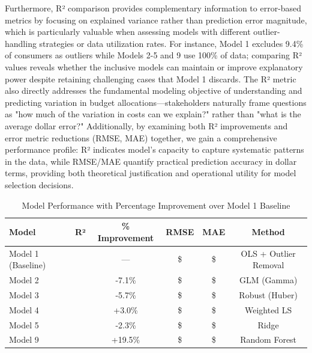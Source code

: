 Furthermore, R² comparison provides complementary information to error-based metrics by focusing on explained variance rather than prediction error magnitude, which is particularly valuable when assessing models with different outlier-handling strategies or data utilization rates. For instance, Model 1 excludes 9.4\% of consumers as outliers while Models 2-5 and 9 use 100\% of data; comparing R² values reveals whether the inclusive models can maintain or improve explanatory power despite retaining challenging cases that Model 1 discards. The R² metric also directly addresses the fundamental modeling objective of understanding and predicting variation in budget allocations—stakeholders naturally frame questions as "how much of the variation in costs can we explain?" rather than "what is the average dollar error?" Additionally, by examining both R² improvements and error metric reductions (RMSE, MAE) together, we gain a comprehensive performance profile: R² indicates model's capacity to capture systematic patterns in the data, while RMSE/MAE quantify practical prediction accuracy in dollar terms, providing both theoretical justification and operational utility for model selection decisions.

\begin{table}[h!]
\centering
\caption{Model Performance with Percentage Improvement over Model 1 Baseline}
\label{tab:comparison_with_improvements}
\begin{tabular}{lccccc}
\toprule
\textbf{Model} & \textbf{R²} & \textbf{\% Improvement} & \textbf{RMSE} & \textbf{MAE} & \textbf{Method} \\
\midrule
Model 1 (Baseline) & \ModelOneRSquaredTest{} & --- & \$\ModelOneRMSETest{} & \$\ModelOneMAETest{} & OLS + Outlier Removal \\
\midrule
Model 2 & \ModelTwoRSquaredTest{} & -7.1\% & \$\ModelTwoRMSETest{} & \$\ModelTwoMAETest{} & GLM (Gamma) \\
Model 3 & \ModelThreeRSquaredTest{} & -5.7\% & \$\ModelThreeRMSETest{} & \$\ModelThreeMAETest{} & Robust (Huber) \\
Model 4 & \ModelFourRSquaredTest{} & +3.0\% & \$\ModelFourRMSETest{} & \$\ModelFourMAETest{} & Weighted LS \\
Model 5 & \ModelFiveRSquaredTest{} & -2.3\% & \$\ModelFiveRMSETest{} & \$\ModelFiveMAETest{} & Ridge \\
Model 9 & \ModelNineRSquaredTest{} & +19.5\% & \$\ModelNineRMSETest{} & \$\ModelNineMAETest{} & Random Forest \\
\bottomrule
\end{tabular}
\end{table}

